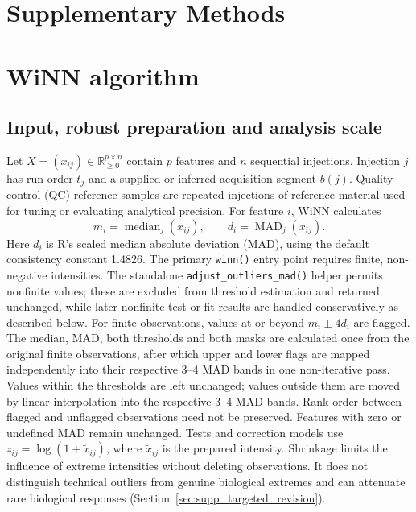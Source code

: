 \documentclass[namedate,webpdf,modern,large,nocrop]{oup-authoring-template}
\begin{document}
\section*{Supplementary Methods}

\section{WiNN algorithm}
\label{sec:supp_algorithm}

\subsection{Input, robust preparation and analysis scale}

Let \(X=(x_{ij})\in\mathbb{R}_{\geq0}^{p\times n}\) contain \(p\) features and \(n\) sequential injections. Injection \(j\) has run order \(t_j\) and a supplied or inferred acquisition segment \(b(j)\). Quality-control (QC) reference samples are repeated injections of reference material used for tuning or evaluating analytical precision. For feature \(i\), WiNN calculates
\[
m_i=\operatorname{median}_{j}(x_{ij}),\qquad d_i=\operatorname{MAD}_{j}(x_{ij}).
\]
Here \(d_i\) is R's scaled median absolute deviation (MAD), using the default consistency constant 1.4826. The primary \texttt{winn()} entry point requires finite, non-negative intensities. The standalone \texttt{adjust\_outliers\_mad()} helper permits nonfinite values; these are excluded from threshold estimation and returned unchanged, while later nonfinite test or fit results are handled conservatively as described below. For finite observations, values at or beyond \(m_i\pm4d_i\) are flagged. The median, MAD, both thresholds and both masks are calculated once from the original finite observations, after which upper and lower flags are mapped independently into their respective 3--4 MAD bands in one non-iterative pass. Values within the thresholds are left unchanged; values outside them are moved by linear interpolation into the respective 3--4 MAD bands. Rank order between flagged and unflagged observations need not be preserved. Features with zero or undefined MAD remain unchanged. Tests and correction models use \(z_{ij}=\log(1+\widetilde x_{ij})\), where \(\widetilde x_{ij}\) is the prepared intensity. Shrinkage limits the influence of extreme intensities without deleting observations. It does not distinguish technical outliers from genuine biological extremes and can attenuate rare biological responses (Section~\ref{sec:supp_targeted_revision}).
\end{document}
